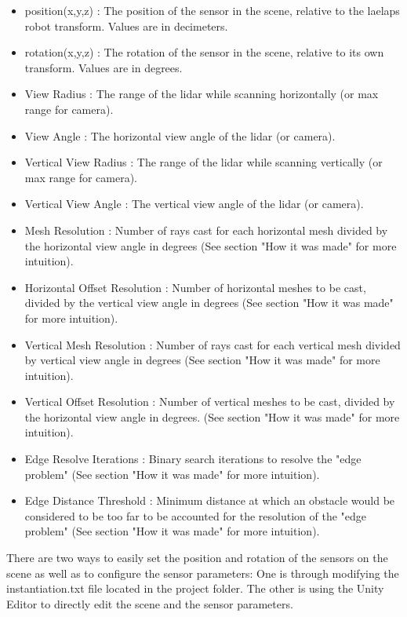 \documentclass{article}
\begin{document}
\begin{itemize}

\item position(x,y,z) : The position of the sensor in the scene, relative to the laelaps robot transform. Values are in decimeters.
\item rotation(x,y,z) :  The rotation of the sensor in the scene, relative to its own transform. Values are in degrees.
\item View Radius : The range of the lidar while scanning horizontally (or max range for camera). 
\item View Angle : The horizontal view angle of the lidar (or camera).
\item Vertical View Radius : The range of the lidar while scanning vertically (or max range for camera).
\item Vertical View Angle : The vertical view angle of the lidar (or camera).
\item Mesh Resolution : Number of rays cast for each horizontal mesh divided by the horizontal view angle in degrees (See section "How it was made" for more intuition).
\item Horizontal Offset Resolution : Number of horizontal meshes to be cast, divided by the vertical view angle in degrees (See section "How it was made" for more intuition).
\item Vertical Mesh Resolution : Number of rays cast for each vertical mesh divided by vertical view angle in degrees (See section "How it was made" for more intuition).
\item Vertical Offset Resolution : Number of vertical meshes to be cast, divided by the horizontal view angle in degrees. (See section "How it was made" for more intuition). 
\item Edge Resolve Iterations : Binary search iterations to resolve the "edge problem" (See section "How it was made" for more intuition). 
\item Edge Distance Threshold : Minimum distance at which an obstacle would be considered to be too far to be accounted for the resolution of the "edge problem" (See section "How it was made" for more intuition). 

\end{itemize}

There are two ways to easily set the position and rotation of the sensors on the scene as well as to configure the sensor parameters: One is through modifying the instantiation.txt file located in the project folder. The other is using the Unity Editor to directly edit the scene and the sensor parameters.
\end{document}
